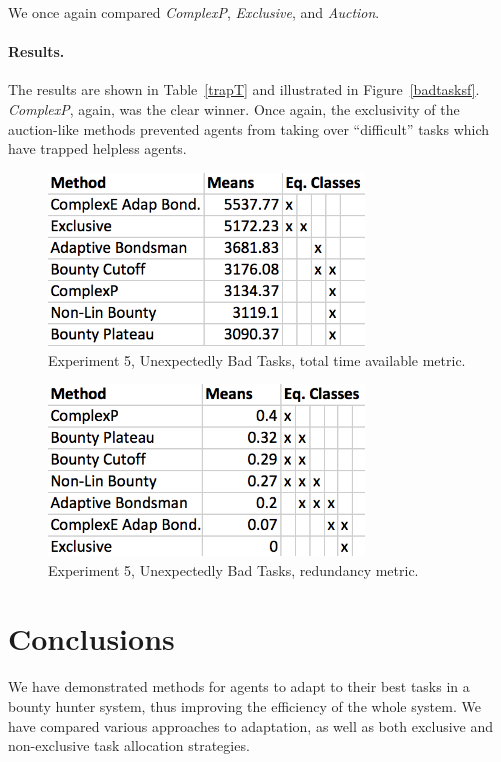\documentclass[letterpaper]{aamas2015}
\newcommand\paragrapha[1]{\paragraph*{{#1}.}}
\begin{document}
We once again compared \textit{ComplexP}, \textit{Exclusive}, and \textit{Auction}.

\paragrapha{Results} The results are shown in Table~\ref{trapT} and illustrated in Figure~\ref{badtasksf}.  \textit{ComplexP}, again, was the clear winner.  Once again, the exclusivity of the auction-like methods prevented agents from taking over ``difficult'' tasks which have trapped helpless agents.

\begin{figure}[t]
\begin{center}\includegraphics[width=3.3in]{trapsT.png}\end{center}
\vspace{-0.5em}\caption{Experiment 5, Unexpectedly Bad Tasks, total time available metric.}
\label{trapsT}
\end{figure}

\begin{figure}[t]
\begin{center}\includegraphics[width=3.3in]{trapsR.png}\end{center}
\vspace{-0.5em}\caption{Experiment 5, Unexpectedly Bad Tasks, redundancy metric.}
\label{trapsR}
\end{figure}


\vspace{-0.5em}
\section{Conclusions} 

We have demonstrated methods for agents to adapt to their best tasks in a bounty hunter system, thus improving the efficiency of the whole system.  We have compared various approaches to adaptation, as well as both exclusive and non-exclusive task allocation strategies.  
\end{document}

